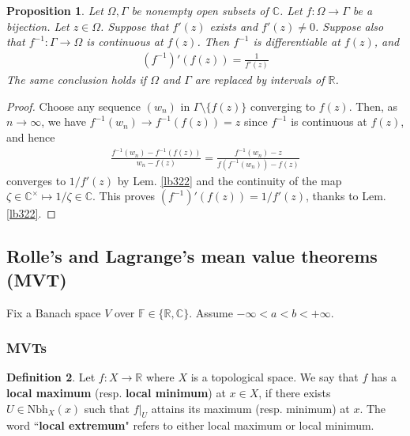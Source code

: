 \documentclass[12pt,b5paper,notitlepage]{article}
\theoremstyle{definition}
\newtheorem{df}{Definition}[section]
\theoremstyle{plain}
\newtheorem{pp}[df]{Proposition}
\newcommand{\Cbb}{\mathbb C}
\newcommand{\Rbb}{\mathbb R}
\newcommand{\Fbb}{\mathbb F}
\newcommand{\Nbh}{\mathrm{Nbh}}
\numberwithin{equation}{section}
\begin{document}
\begin{pp}\label{lb337}
Let $\Omega,\Gamma$ be nonempty open subsets of $\Cbb$. Let $f:\Omega\rightarrow\Gamma$ be a bijection. Let $z\in\Omega$. Suppose that $f'(z)$ exists and $f'(z)\neq 0$. Suppose also that $f^{-1}:\Gamma\rightarrow\Omega$ is continuous at $f(z)$. Then $f^{-1}$ is differentiable at $f(z)$, and
\begin{align}
(f^{-1})'(f(z))=\frac 1{f'(z)}
\end{align}
The same conclusion holds if $\Omega$ and $\Gamma$ are replaced by intervals of $\Rbb$.
\end{pp}


\begin{proof}
Choose any sequence $(w_n)$ in $\Gamma\setminus\{f(z)\}$ converging to $f(z)$. Then, as $n\rightarrow\infty$, we have $f^{-1}(w_n)\rightarrow f^{-1}(f(z))=z$ since $f^{-1}$ is continuous at $f(z)$, and hence
\begin{align}
\frac{f^{-1}(w_n)-f^{-1}(f(z))}{w_n-f(z)}=\frac{f^{-1}(w_n)-z}{f(f^{-1}(w_n))-f(z)}
\end{align}
converges to $1/f'(z)$ by Lem. \ref{lb322} and the continuity of the map $\zeta\in\Cbb^{\times}\mapsto 1/\zeta\in\Cbb$. This proves $(f^{-1})'(f(z))=1/f'(z)$, thanks to Lem. \ref{lb322}.
\end{proof}








\begin{comment}

The Leibniz rule \eqref{eq111} can be generalized to higher derivatives. 

\end{comment}


\subsection{Rolle's and Lagrange's mean value theorems (MVT)} 

Fix a Banach space $V$ over $\Fbb\in\{\Rbb,\Cbb\}$. Assume $-\infty<a<b<+\infty$.

\subsubsection{MVTs}



\begin{df}
Let $f:X\rightarrow \Rbb$ where $X$ is a topological space. We say that $f$ has a \textbf{local maximum} (resp. \textbf{local minimum})  at $x\in X$, if there exists $U\in\Nbh_X(x)$ such that $f|_U$ attains its maximum (resp. minimum) at $x$. The word ``\textbf{local extremum}"  refers to either local maximum or local minimum.
\end{df}
\end{document}
